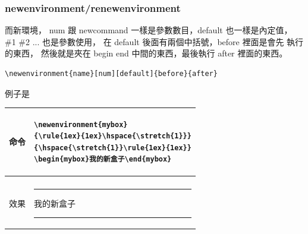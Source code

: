     \subsubsection{newenvironment/renewenvironment}
    而新環境， num 跟 newcommand 一樣是參數數目，default 也一樣是內定值，
    \#1 \#2 ... 也是參數使用， 在 default 後面有兩個中括號，before 裡面是會先
    執行的東西， 然後就是夾在 begin end 中間的東西，最後執行 after 裡面的東西。
    \begin{verbatim}
\newenvironment{name}[num][default]{before}{after}
    \end{verbatim}
    例子是
    \begin{flushleft}
      \begin{tabular}{m{}|m{}}
      命令 & 
      \begin{verbatim}
\newenvironment{mybox}
{\rule{1ex}{1ex}\hspace{\stretch{1}}}
{\hspace{\stretch{1}}\rule{1ex}{1ex}}
\begin{mybox}我的新盒子\end{mybox}
      \end{verbatim}  \\
      \hline \\[0.2cm]
      效果 &
      \newenvironment{mybox}
      {\rule{1ex}{1ex}\hspace{\stretch{1}}}
      {\hspace{\stretch{1}}\rule{1ex}{1ex}}
      \begin{mybox}我的新盒子\end{mybox}
      \end{tabular}
    \end{flushleft}

